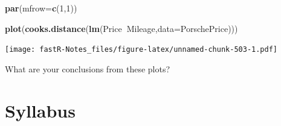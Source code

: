 \documentclass[]{book}
\newenvironment{Shaded}{\begin{snugshade}}{\end{snugshade}}
\newcommand{\KeywordTok}[1]{\textcolor[rgb]{0.13,0.29,0.53}{\textbf{#1}}}
\newcommand{\DataTypeTok}[1]{\textcolor[rgb]{0.13,0.29,0.53}{#1}}
\newcommand{\DecValTok}[1]{\textcolor[rgb]{0.00,0.00,0.81}{#1}}
\newcommand{\OperatorTok}[1]{\textcolor[rgb]{0.81,0.36,0.00}{\textbf{#1}}}
\newcommand{\NormalTok}[1]{#1}
\theoremstyle{definition}
\theoremstyle{definition}
\theoremstyle{definition}
\theoremstyle{remark}
\begin{document}
\begin{Shaded}
\begin{Highlighting}[]
\KeywordTok{par}\NormalTok{(}\DataTypeTok{mfrow=}\KeywordTok{c}\NormalTok{(}\DecValTok{1}\NormalTok{,}\DecValTok{1}\NormalTok{))}
\end{Highlighting}
\end{Shaded}

\begin{Shaded}
\begin{Highlighting}[]
\KeywordTok{plot}\NormalTok{(}\KeywordTok{cooks.distance}\NormalTok{(}\KeywordTok{lm}\NormalTok{(Price}\OperatorTok{~}\NormalTok{Mileage,}\DataTypeTok{data=}\NormalTok{PorschePrice)))}
\end{Highlighting}
\end{Shaded}

\texttt{[image: fastR-Notes\_files/figure-latex/unnamed-chunk-503-1.pdf]}

What are your conclusions from these plots?

\appendix


\chapter{Syllabus}\label{AppA}
\end{document}
